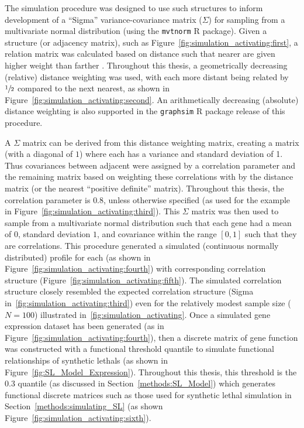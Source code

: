 The simulation procedure was designed to use such  structures to inform development of a ``Sigma'' variance-covariance matrix ($\Sigma$) for sampling from a multivariate normal distribution (using the \texttt{mvtnorm} R package). Given a  structure (or adjacency matrix), such as Figure~\ref{fig:simulation_activating:first}, a relation matrix was calculated based on distance such that nearer  are given higher weight than farther . Throughout this thesis, a geometrically decreasing (relative) distance weighting was used, with each more distant  being related by $\sfrac{1}{2}$ compared to the next nearest, as shown in Figure~\ref{fig:simulation_activating:second}. An arithmetically decreasing (absolute) distance weighting is also supported in the \texttt{graphsim} R package release of this procedure.

A $\Sigma$ matrix can be derived from this distance weighting matrix, creating a matrix (with a diagonal of $1$) where each  has a variance and standard deviation of 1. Thus covariances between adjacent  were assigned by a correlation parameter and the remaining matrix based on weighting these correlations with by the distance matrix (or the nearest ``positive definite'' matrix). Throughout this thesis, the correlation parameter is $0.8$, unless otherwise specified (as used for the example in Figure~\ref{fig:simulation_activating:third}). This $\Sigma$ matrix was then used to sample from a multivariate normal distribution such that each gene had a mean of $0$, standard deviation $1$, and covariance within the range $[0,1]$ such that they are correlations. This procedure generated a simulated (continuous normally distributed)  profile for each  (as shown in Figure~\ref{fig:simulation_activating:fourth}) with corresponding correlation structure (Figure~\ref{fig:simulation_activating:fifth}). The simulated correlation structure closely resembled the expected correlation structure (Sigma in~\ref{fig:simulation_activating:third}) even for the relatively modest sample size ($N=100$) illustrated in~\ref{fig:simulation_activating}. Once a simulated \gls{gene expression} dataset has been generated (as in Figure~\ref{fig:simulation_activating:fourth}), then a discrete matrix of gene function was constructed with a functional threshold quantile to simulate functional relationships of \glspl{synthetic lethal} (as shown in Figure~\ref{fig:SL_Model_Expression}). Throughout this thesis, this threshold is the 0.3 quantile (as discussed in Section~\ref{methods:SL_Model}) which generates functional discrete matrices such as those used for \gls{synthetic lethal} simulation in Section~\ref{methods:simulating_SL} (as shown Figure~\ref{fig:simulation_activating:sixth}).

